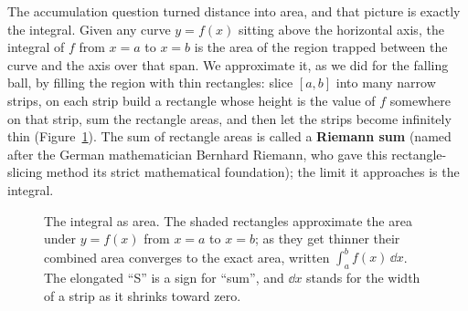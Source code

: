 The accumulation question turned distance into area, and that picture is exactly
the integral. Given any curve $y = f(x)$ sitting above the horizontal axis, the
integral of $f$ from $x = a$ to $x = b$ is the area of the region trapped between
the curve and the axis over that span. We approximate it, as we did for the
falling ball, by filling the region with thin rectangles: slice $[a,b]$ into
many narrow strips, on each strip build a rectangle whose height is the value of
$f$ somewhere on that strip, sum the rectangle areas, and then let the strips
become infinitely thin (Figure~\ref{ch01:fig-area}). The sum of rectangle areas is
called a \textbf{Riemann sum} (named after the German mathematician Bernhard Riemann,
who gave this rectangle-slicing method its strict mathematical foundation); the
limit it approaches is the integral.

\begin{figure}[htbp]
\centering
{}
\caption{The integral as area. The shaded rectangles approximate the area under
$y=f(x)$ from $x=a$ to $x=b$; as they get thinner their combined area converges
to the exact area, written $\int_a^b f(x)\,\dd x$. The elongated ``S'' is a
sign for ``sum'', and $\dd x$ stands for the width of a strip as it shrinks toward zero.}
\label{ch01:fig-area}
\end{figure}

